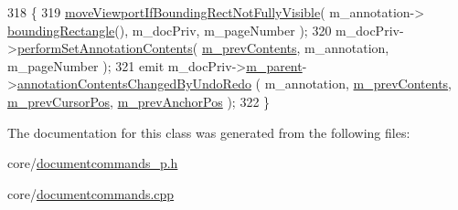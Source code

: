 \begin{DoxyCode}
318 \{
319     \hyperlink{namespaceOkular_a1e0f22fec5a200bd3b1835b7bfd95172}{moveViewportIfBoundingRectNotFullyVisible}( m\_annotation->
      \hyperlink{classOkular_1_1Annotation_a450fbd08aeb31262a33a628b4ab0dd42}{boundingRectangle}(), m\_docPriv, m\_pageNumber );
320     m\_docPriv->\hyperlink{classOkular_1_1DocumentPrivate_a0336653af57e45c3f8cade651bb2fc1a}{performSetAnnotationContents}( 
      \hyperlink{classOkular_1_1EditTextCommand_a461d065fa44222a7c94a23ce2df39188}{m\_prevContents}, m\_annotation, m\_pageNumber );
321     emit m\_docPriv->\hyperlink{classOkular_1_1DocumentPrivate_ac921eda41c014869ffec96ecc569c713}{m\_parent}->\hyperlink{classOkular_1_1Document_a755d2a16ad3ed30996c93924f7232e36}{annotationContentsChangedByUndoRedo}
      ( m\_annotation, \hyperlink{classOkular_1_1EditTextCommand_a461d065fa44222a7c94a23ce2df39188}{m\_prevContents}, \hyperlink{classOkular_1_1EditTextCommand_a5bc4e5af11ce42281c590750e0c75b51}{m\_prevCursorPos}, 
      \hyperlink{classOkular_1_1EditTextCommand_afe5d2bc5003ae94ec364eeabd5789e64}{m\_prevAnchorPos} );
322 \}
\end{DoxyCode}


The documentation for this class was generated from the following files\+:\begin{DoxyCompactItemize}
\item 
core/\hyperlink{documentcommands__p_8h}{documentcommands\+\_\+p.\+h}\item 
core/\hyperlink{documentcommands_8cpp}{documentcommands.\+cpp}\end{DoxyCompactItemize}
